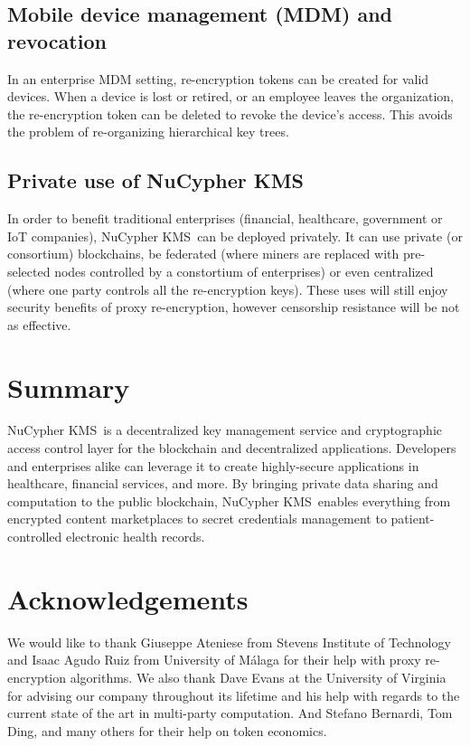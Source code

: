 \documentclass[longbibliography,nofootinbib]{revtex4-1}
\newcommand{\kms}{NuCypher KMS}
\begin{document}
\subsection{Mobile device management (MDM) and revocation}
\label{sec:mdm}
In an enterprise MDM setting, re-encryption tokens can be created for valid devices. When a device is lost or retired,
or an employee leaves the organization, the re-encryption token can be deleted to revoke the device's access. This avoids the
problem of re-organizing hierarchical key trees.

\subsection{Private use of \kms}
In order to benefit traditional enterprises (financial, healthcare, government or IoT companies), \kms~can be deployed privately.
It can use private (or consortium) blockchains,
be federated (where miners are replaced with pre-selected nodes controlled by a constortium of enterprises)
or even centralized (where one party controls all the re-encryption keys).
These uses will still enjoy security benefits of proxy re-encryption, however censorship resistance will be not as effective.

\section{Summary}
\kms~is a decentralized key management service and cryptographic access control layer for the blockchain and
decentralized applications.
Developers and enterprises alike can leverage it to create highly-secure applications in healthcare,
financial services, and more.
By bringing private data sharing and computation to the public blockchain, \kms~enables everything from encrypted
content marketplaces to secret credentials management to patient-controlled electronic health records.

\section{Acknowledgements}
We would like to thank Giuseppe Ateniese from Stevens Institute of Technology and Isaac Agudo Ruiz from University of M{\'a}laga
for their help with proxy re-encryption algorithms.
We also thank Dave Evans at the University of Virginia for advising our company throughout its lifetime
and his help with regards to the current state of the art in multi-party computation.
And Stefano Bernardi, Tom Ding, and many others for their help on token economics.


\end{document}

